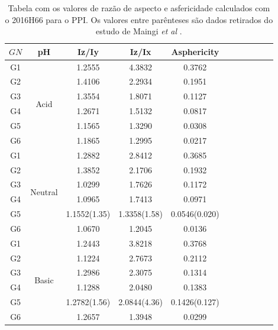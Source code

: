 \begin{table}[ht!] %
\centering
    \begin{tabular}{ccccccccccc}
 \hline
 $GN$   & pH  &   Iz/Iy   &   Iz/Ix   & Asphericity   \\
 \hline
 \hline%
 G1     &  \multirow{6}{*}{Acid}    &   1.2555&4.3832&0.3762\\
 G2     &                           &   1.4106&2.2934&0.1951\\
 G3     &                           &   1.3554&1.8071&0.1127\\
 G4     &                           &   1.2671&1.5132&0.0817\\
 G5     &                           &   1.1565&1.3290&0.0308\\
 G6     &                           &   1.1865&1.2995&0.0217\\
 \hline
 G1     &  \multirow{6}{*}{Neutral} &   1.2882&2.8412&0.3685\\
 G2     &                           &   1.3852&2.1706&0.1932\\
 G3     &                           &   1.0299&1.7626&0.1172\\
 G4     &                           &   1.0965&1.7413&0.0971\\
 G5     &                           &   1.1552(1.35)&1.3358(1.58)&0.0546(0.020)\\
 G6     &                           &   1.0670&1.2045&0.0136\\
 \hline
 G1     &  \multirow{6}{*}{Basic}   &   1.2443&3.8218&0.3768\\
 G2     &                           &   1.1224&2.7673&0.2112\\
 G3     &                           &   1.2986&2.3075&0.1314\\
 G4     &                           &   1.1288&2.0480&0.1383\\
 G5     &                           &   1.2782(1.56)&2.0844(4.36)&0.1426(0.127)\\
 G6     &                           &   1.2657&1.3948&0.0299\\
 \hline
    \end{tabular}
\caption{Tabela com os valores de razão de aspecto e asfericidade calculados com o 2016H66 para o PPI. Os valores entre parênteses são dados retirados do estudo de Maingi \textit{et al} \cite{Maingi2012}.}
\label{tab:PPIAsfericidade}
\end{table}

